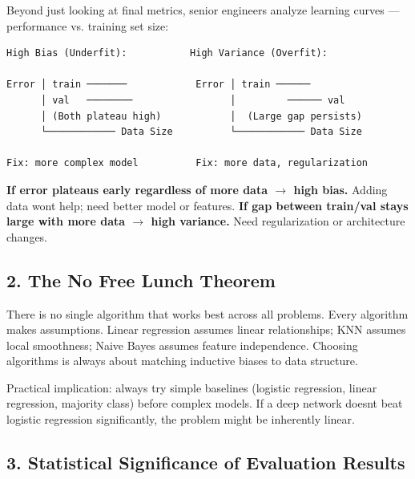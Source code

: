 \documentclass[11pt]{article}
\begin{document}

Beyond just looking at final metrics, senior engineers analyze learning curves --- performance vs. training set size:

\setcodelang{}

\begin{verbatim}
High Bias (Underfit):           High Variance (Overfit):

Error │ train ───────            Error │ train ──────
      │ val   ────────                 │         ────── val
      │ (Both plateau high)            │  (Large gap persists)
      └──────────── Data Size          └──────────── Data Size
      
Fix: more complex model          Fix: more data, regularization
\end{verbatim}

\textbf{If error plateaus early regardless of more data \(\rightarrow\) high bias.} Adding data won\textquotesingle t help; need better model or features.
\textbf{If gap between train/val stays large with more data \(\rightarrow\) high variance.} Need regularization or architecture changes.

\subsection{2. The No Free Lunch Theorem}\label{2-the-no-free-lunch-theorem}

There is no single algorithm that works best across all problems. Every algorithm makes assumptions. Linear regression assumes linear relationships; KNN assumes local smoothness; Naive Bayes assumes feature independence. Choosing algorithms is always about matching inductive biases to data structure.

Practical implication: always try simple baselines (logistic regression, linear regression, majority class) before complex models. If a deep network doesn\textquotesingle t beat logistic regression significantly, the problem might be inherently linear.

\subsection{3. Statistical Significance of Evaluation Results}\label{3-statistical-significance-of-evaluation-results}
\end{document}

